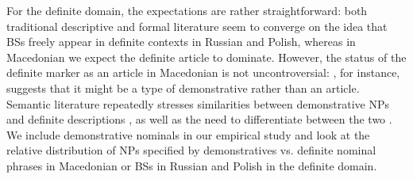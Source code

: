 \documentclass[output=paper,colorlinks,citecolor=brown]{langscibook}
\begin{document}
For the definite domain, the expectations are rather straightforward: both traditional descriptive and formal literature seem to converge on the idea that BSs freely appear in definite contexts in Russian and Polish, whereas in Macedonian we expect the definite article to dominate. However, the status of the definite marker as an article in Macedonian is not uncontroversial: \citet[313]{Rudin2021}, for instance, suggests that it might be a type of demonstrative rather than an article. Semantic literature repeatedly stresses similarities between demonstrative NPs and definite descriptions \citep[e.g.,][]{Roberts2002, bor+:Elbourne2008}, as well as the need to differentiate between the two \citep{Lyons1999}. We include demonstrative nominals in our empirical study and look at the relative distribution of NPs specified by demonstratives vs. definite nominal phrases in Macedonian or BSs in Russian and Polish in the definite domain.%
\end{document}
